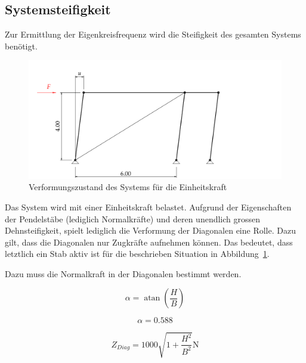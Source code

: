 \documentclass[
  letterpaper,
  DIV=11]{scrreprt}
\begin{document}
\hypertarget{systemsteifigkeit}{%
\subsection{Systemsteifigkeit}\label{systemsteifigkeit}}

Zur Ermittlung der Eigenkreisfrequenz wird die Steifigkeit des gesamten
Systems benötigt.

\begin{figure}[H]

{\centering \includegraphics{index_files/mediabag/bilder/aufgabe_ems_ge_verformung.pdf}

}

\caption{\label{fig-ems_ges_verform_FW}Verformungszustand des Systems
für die Einheitskraft}

\end{figure}

Das System wird mit einer Einheitskraft belastet. Aufgrund der
Eigenschaften der Pendelstäbe (lediglich Normalkräfte) und deren
unendlich grossen Dehnsteifigkeit, spielt lediglich die Verformung der
Diagonalen eine Rolle. Dazu gilt, dass die Diagonalen nur Zugkräfte
aufnehmen können. Das bedeutet, dass letztlich ein Stab aktiv ist für
die beschrieben Situation in Abbildung~\ref{fig-ems_ges_verform_FW}.

Dazu muss die Normalkraft in der Diagonalen bestimmt werden.

\begin{equation}\alpha = \operatorname{atan}{\left(\frac{H}{B} \right)}\end{equation}

\begin{equation}\alpha = 0.588\end{equation}

\begin{equation}Z_{Diag} = 1000 \sqrt{1 + \frac{H^{2}}{B^{2}}} \text{N}\end{equation}
\end{document}
